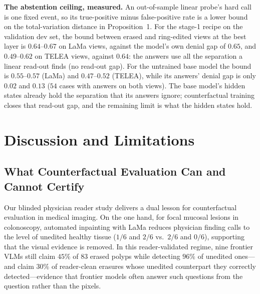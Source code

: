 \documentclass{article} %
\begin{document}
\textbf{The abstention ceiling, measured.} An out-of-sample linear probe's hard call is one fixed event, so its true-positive minus false-positive rate is a lower bound on the total-variation distance in Proposition~1. For the stage-1 recipe on the validation dev set, the bound between erased and ring-edited views at the best layer is $0.64$--$0.67$ on LaMa views, against the model's own denial gap of $0.65$, and $0.49$--$0.62$ on TELEA views, against $0.64$: the answers use all the separation a linear read-out finds (no read-out gap). For the untrained base model the bound is $0.55$--$0.57$ (LaMa) and $0.47$--$0.52$ (TELEA), while its answers' denial gap is only $0.02$ and $0.13$ ($54$ cases with answers on both views). The base model's hidden states already hold the separation that its answers ignore; counterfactual training closes that read-out gap, and the remaining limit is what the hidden states hold.

\section{Discussion and Limitations}
\label{sec:discussion}

\subsection{What Counterfactual Evaluation Can and Cannot Certify}
\label{subsec:disc_certify}
Our blinded physician reader study delivers a dual lesson for counterfactual evaluation in medical imaging. On the one hand, for focal mucosal lesions in colonoscopy, automated inpainting with LaMa reduces physician finding calls to the level of unedited healthy tissue ($1/6$ and $2/6$ vs.\ $2/6$ and $0/6$), supporting that the visual evidence is removed. In this reader-validated regime, nine frontier VLMs still claim $45\%$ of $83$ erased polyps while detecting $96\%$ of unedited ones---and claim $30\%$ of reader-clean erasures whose unedited counterpart they correctly detected---evidence that frontier models often answer such questions from the question rather than the pixels.
\end{document}
